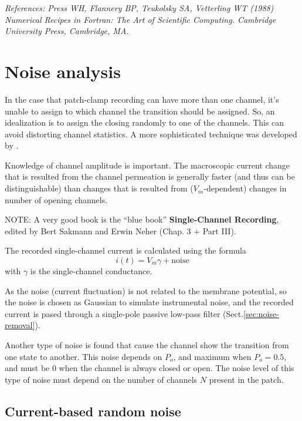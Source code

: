 {\it References: Press WH, Flannery BP, Teukolsky SA, Vetterling WT (1988)
Numerical Recipes in Fortran: The Art of Scientific Computing. Cambridge
University Press, Cambridge, MA.}



\chapter{Noise analysis}
\label{sec:noise-analysis}

\begin{framed}
In the case that patch-clamp recording can have more than one channel, it's
unable to assign to which channel the transition should be assigned. So, an
idealization is to assign the closing randomly to one of the channels. This can
avoid distorting channel statistics. A more sophisticated technique was
developed by \citep{jackson1985}.
\end{framed}

Knowledge of channel amplitude is important. The macroscopic current change that
is resulted from the channel permeation is generally faster (and thus can be
distinguishable) than changes that is resulted from ($V_m$-dependent) changes in
number of opening channels.

NOTE: A very good book is the ``blue book'' {\bf Single-Channel Recording},
edited by Bert Sakmann and Erwin Neher (Chap. 3 + Part III).

The recorded single-channel current is calculated using the formula
\begin{equation}
i(t) = V_m \gamma + \text{noise}
\end{equation}
with $\gamma$ is the single-channel conductance.

As the noise (current fluctuation) is not related to the membrane potential, so
the noise is chosen as Gaussian to simulate instrumental noise, and the recorded
current is pased through a single-pole passive low-pass filter
(Sect.\ref{sec:noise-removal}).

Another type of noise is found that cause the channel show the transition from
one state to another. This noise depends on $P_o$, and maximum when $P_o=0.5$,
and must be 0 when the channel is always closed or open. The noise level of this
type of noise must depend on the number of channels $N$ present in the patch.

\section{Current-based random noise}
\label{sec:noise-in-channel-current-recording}

